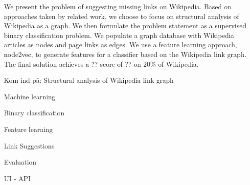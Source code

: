 We present the problem of suggesting missing links on Wikipedia. Based on approaches taken by related work, we choose to focus on structural analysis of Wikipedia as a graph. We then formulate the problem statement as a supervised binary classification problem. We populate a graph database with Wikipedia articles as nodes and page links as edges. We use a feature learning approach, node2vec, to generate features for a classifier based on the Wikipedia link graph. The final solution achieves a ?? score of ?? on 20\% of Wikipedia.


Kom ind på:
Structural analysis of Wikipedia link graph

Machine learning

Binary classification

Feature learning

Link Suggestions

Evaluation

UI - API